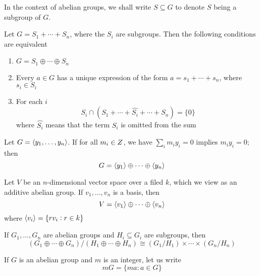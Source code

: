 \documentclass[11pt]{article}
\begin{document}
In the context of abelian groups, we shall write \(S\subseteq G\) to denote
\(S\) being a subgroup of \(G\).


\begin{proposition}[]
\label{prop5.4}
Let \(G=S_1+\cdots+S_n\), where the \(S_i\) are subgroups. Then the following
conditions are equivalent
\begin{enumerate}
\item \(G=S_1\oplus\cdots\oplus S_n\)
\item Every \(a\in G\) has a unique expression of the form
\(a=s_1+\cdots+s_n\), where \(s_i\in S_i\)
\item For each \(i\)
\begin{equation*}
S_i\cap(S_1+\cdots+\widehat{S_i}+\cdots+S_n)=\{0\}
\end{equation*}
where \(\widehat{S_i}\) means that the term \(S_i\) is omitted from the
sum
\end{enumerate}
\end{proposition}

\begin{corollary}[]
Let \(G=\langle y_1,\dots,y_n\rangle\). If for all \(m_i\in\relax{Z}\), we have
\(\sum_im_iy_i=0\) implies \(m_iy_i=0\); then
\begin{equation*}
G=\langle y_1\rangle\oplus\cdots\oplus\langle y_n\rangle
\end{equation*}
\end{corollary}

\begin{examplle}[]
Let \(V\) be an \(n\)-dimensional vector space over a filed \(k\), which we view
as an additive abelian group. If \(v_1,\dots,v_n\) is a basis, then
\begin{equation*}
V=\langle v_1\rangle\oplus\cdots\oplus\langle v_n\rangle
\end{equation*}
where \(\langle v_i\rangle=\{rv_i:r\in k\}\)
\end{examplle}

\begin{proposition}[]
\label{prop5.7}
If \(G_1,\dots,G_n\) are abelian groups and \(H_i\subseteq G_i\) are
subgroups, then
\begin{equation*}
(G_1\oplus\cdots\oplus G_n)/(H_1\oplus\cdots\oplus H_n)\cong(G_1/H_1)
\times\cdots\times(G_n/H_n)
\end{equation*}
\end{proposition}

If \(G\) is an abelian group and \(m\) is an integer, let us write
\begin{equation*}
mG=\{ma:a\in G\}
\end{equation*}
\end{document}
